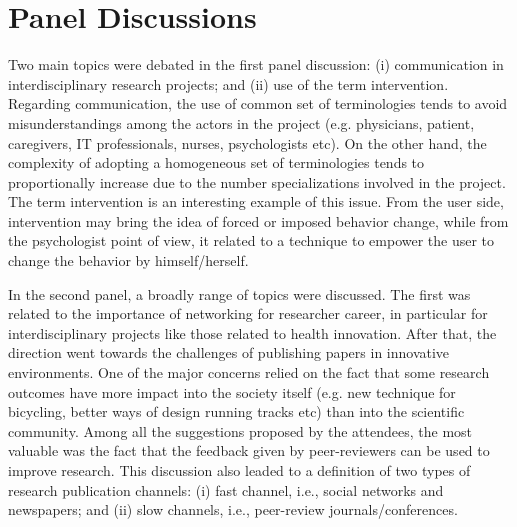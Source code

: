 \section{Panel Discussions}

Two main topics were debated in the first panel discussion: (i) communication in interdisciplinary research projects; and (ii) use of the term intervention. 
Regarding communication, the use of common set of terminologies tends to avoid misunderstandings among the actors in the project (e.g. physicians, patient, caregivers, IT professionals, nurses, psychologists etc). 
On the other hand, the complexity of adopting a homogeneous set of terminologies tends to proportionally increase due to the number specializations involved in the project. 
The term intervention is an interesting example of this issue. 
From the user side, intervention may bring the idea of forced or imposed behavior change, while from the psychologist point of view, it related to a technique to empower the user to change the behavior by himself/herself.
 
In the second panel, a broadly range of topics were discussed. 
The first was related to the importance of networking for researcher career, in particular for interdisciplinary projects like those related to health innovation. 
After that, the direction went towards the challenges of publishing papers in innovative environments.
One of the major concerns relied on the fact that some research outcomes have more impact into the society itself (e.g. new technique for bicycling, better ways of design running tracks etc) than into the scientific community.
Among all the suggestions proposed by the attendees, the most valuable was the fact that the feedback given by peer-reviewers can be used to improve research. 
This discussion also leaded to a definition of two types of research publication channels: (i) fast channel, i.e., social networks and newspapers; and (ii) slow channels, i.e., peer-review journals/conferences.


